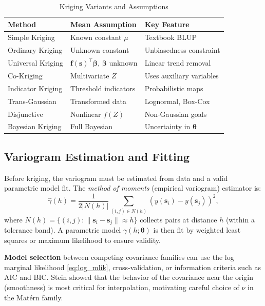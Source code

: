 \documentclass[conference]{IEEEtran}
\begin{document}
\begin{table}[t]
\caption{Kriging Variants and Assumptions}
\label{tab:kriging_variants}
\centering
\renewcommand{\arraystretch}{1.3}
\begin{tabular}{@{}lll@{}}
\toprule
\textbf{Method} & \textbf{Mean Assumption} & \textbf{Key Feature} \\
\midrule
Simple Kriging & Known constant $\mu$ & Textbook BLUP \\
Ordinary Kriging & Unknown constant & Unbiasedness constraint \\
Universal Kriging & $\mathbf{f}(\mathbf{s})^\top\bm{\beta}$, $\bm{\beta}$ unknown & Linear trend removal \\
Co-Kriging & Multivariate $Z$ & Uses auxiliary variables \\
Indicator Kriging & Threshold indicators & Probabilistic maps \\
Trans-Gaussian & Transformed data & Lognormal, Box-Cox \\
Disjunctive & Nonlinear $f(Z)$ & Non-Gaussian goals \\
Bayesian Kriging & Full Bayesian & Uncertainty in $\bm{\theta}$ \\
\bottomrule
\end{tabular}
\end{table}

\subsection{Variogram Estimation and Fitting}

Before kriging, the variogram must be estimated from data and a valid parametric model fit. The \emph{method of moments} (empirical variogram) estimator is:
\begin{equation}
  \hat{\gamma}(h) = \frac{1}{2|N(h)|}\sum_{(i,j)\in N(h)} (y(\mathbf{s}_i) - y(\mathbf{s}_j))^2,
  \label{eq:empirical_variogram}
\end{equation}
where $N(h) = \{(i,j) : \|\mathbf{s}_i - \mathbf{s}_j\| \approx h\}$ collects pairs at distance $h$ (within a tolerance band). A parametric model $\gamma(h;\bm{\theta})$ is then fit by weighted least squares or maximum likelihood to ensure validity.

\textbf{Model selection} between competing covariance families can use the log marginal likelihood \eqref{eq:log_mlik}, cross-validation, or information criteria such as AIC and BIC. Stein \cite{stein1999interpolation} showed that the behavior of the covariance near the origin (smoothness) is most critical for interpolation, motivating careful choice of $\nu$ in the Mat\'{e}rn family.
\end{document}
